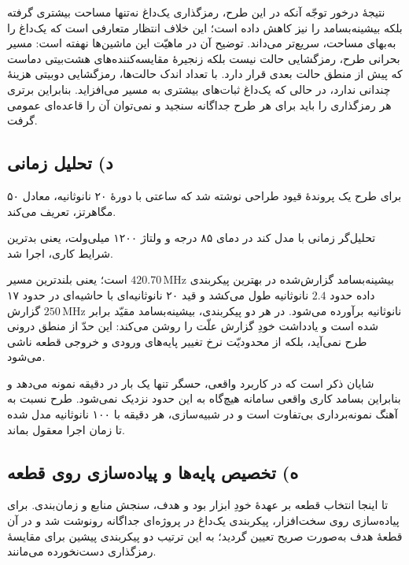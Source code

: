 \documentclass[12pt,a4paper]{article}
\begin{document}
	نتیجهٔ درخور توجّه آنکه در این طرح، رمزگذاری یک‌داغ نه‌تنها مساحت بیشتری گرفته بلکه بیشینه‌بسامد را نیز کاهش داده است؛ این خلاف انتظار متعارفی است که یک‌داغ را به‌بهای مساحت، سریع‌تر می‌داند. توضیح آن در ماهیّت این ماشین‌ها نهفته است: مسیر بحرانی طرح، رمزگشایی حالت نیست بلکه زنجیرهٔ مقایسه‌کننده‌های هشت‌بیتی دماست که پیش از منطق حالت بعدی قرار دارد. با تعداد اندک حالت‌ها، رمزگشایی دوبیتی هزینهٔ چندانی ندارد، در حالی که یک‌داغ ثبات‌های بیشتری به مسیر می‌افزاید. بنابراین برتری هر رمزگذاری را باید برای هر طرح جداگانه سنجید و نمی‌توان آن را قاعده‌ای عمومی گرفت.

	\subsection*{د) تحلیل زمانی}
	برای طرح یک پروندهٔ قیود طراحی نوشته شد که ساعتی با دورهٔ ۲۰ نانوثانیه، معادل ۵۰ مگاهرتز، تعریف می‌کند.


	تحلیل‌گر زمانی با مدل کند در دمای ۸۵ درجه و ولتاژ ۱۲۰۰ میلی‌ولت، یعنی بدترین شرایط کاری، اجرا شد.


	بیشینه‌بسامد گزارش‌شده در بهترین پیکربندی \(420.70\,\mathrm{MHz}\) است؛ یعنی بلندترین مسیر داده حدود \(2.4\) نانوثانیه طول می‌کشد و قید ۲۰ نانوثانیه‌ای با حاشیه‌ای در حدود ۱۷ نانوثانیه برآورده می‌شود. در هر دو پیکربندی، بیشینه‌بسامد مقیّد برابر \(250\,\mathrm{MHz}\) گزارش شده است و یادداشت خودِ گزارش علّت را روشن می‌کند: این حدّ از منطق درونی طرح نمی‌آید، بلکه از محدودیّت نرخ تغییر پایه‌های ورودی و خروجی قطعه ناشی می‌شود.

	شایان ذکر است که در کاربرد واقعی، حسگر تنها یک بار در دقیقه نمونه می‌دهد و بنابراین بسامد کاری واقعی سامانه هیچ‌گاه به این حدود نزدیک نمی‌شود. طرح نسبت به آهنگ نمونه‌برداری بی‌تفاوت است و در شبیه‌سازی، هر دقیقه با ۱۰۰ نانوثانیه مدل شده تا زمان اجرا معقول بماند.

	\subsection*{ه) تخصیص پایه‌ها و پیاده‌سازی روی قطعه}
	تا اینجا انتخاب قطعه بر عهدهٔ خودِ ابزار بود و هدف، سنجش منابع و زمان‌بندی. برای پیاده‌سازی روی سخت‌افزار، پیکربندی یک‌داغ در پروژه‌ای جداگانه رونوشت شد و در آن قطعهٔ هدف به‌صورت صریح تعیین گردید؛ به این ترتیب دو پیکربندی پیشین برای مقایسهٔ رمزگذاری دست‌نخورده می‌مانند.
\end{document}
